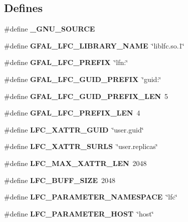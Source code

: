 \subsection*{Defines}
\begin{CompactItemize}
\item 
\#define \textbf{\_\-GNU\_\-SOURCE}\label{gfal__common__lfc_8h_53abf256730d533302d1910e5fb61efe}

\item 
\#define \textbf{GFAL\_\-LFC\_\-LIBRARY\_\-NAME}~\char`\"{}liblfc.so.1\char`\"{}\label{gfal__common__lfc_8h_7da7695351de444e2e18371bb8d6aea5}

\item 
\#define \textbf{GFAL\_\-LFC\_\-PREFIX}~\char`\"{}lfn:\char`\"{}\label{gfal__common__lfc_8h_c00d877428b39b35b4f611656b2d5215}

\item 
\#define \textbf{GFAL\_\-LFC\_\-GUID\_\-PREFIX}~\char`\"{}guid:\char`\"{}\label{gfal__common__lfc_8h_26b46ea74b4efcdd46ce519863bdc90f}

\item 
\#define \textbf{GFAL\_\-LFC\_\-GUID\_\-PREFIX\_\-LEN}~5\label{gfal__common__lfc_8h_4609690cfa23a9bb0a209f745f183c9d}

\item 
\#define \textbf{GFAL\_\-LFC\_\-PREFIX\_\-LEN}~4\label{gfal__common__lfc_8h_0f0b96660a7e6440a6556909e7195109}

\item 
\#define \textbf{LFC\_\-XATTR\_\-GUID}~\char`\"{}user.guid\char`\"{}\label{gfal__common__lfc_8h_8f6afce6b30cd0685eaa45170f52c98e}

\item 
\#define \textbf{LFC\_\-XATTR\_\-SURLS}~\char`\"{}user.replicas\char`\"{}\label{gfal__common__lfc_8h_c1963dd5788b4452446d741e07e7f417}

\item 
\#define \textbf{LFC\_\-MAX\_\-XATTR\_\-LEN}~2048\label{gfal__common__lfc_8h_cb8d26c67c686b15d05f59def23e1356}

\item 
\#define \textbf{LFC\_\-BUFF\_\-SIZE}~2048\label{gfal__common__lfc_8h_90255f6e7148a56a2c09cc15098643d5}

\item 
\#define \textbf{LFC\_\-PARAMETER\_\-NAMESPACE}~\char`\"{}lfc\char`\"{}\label{gfal__common__lfc_8h_647c53a5c04b92f303f2c49c0dad403a}

\item 
\#define \textbf{LFC\_\-PARAMETER\_\-HOST}~\char`\"{}host\char`\"{}\label{gfal__common__lfc_8h_c710a29a2bf2b97a433fbb37ea1e7ecf}

\end{CompactItemize}
